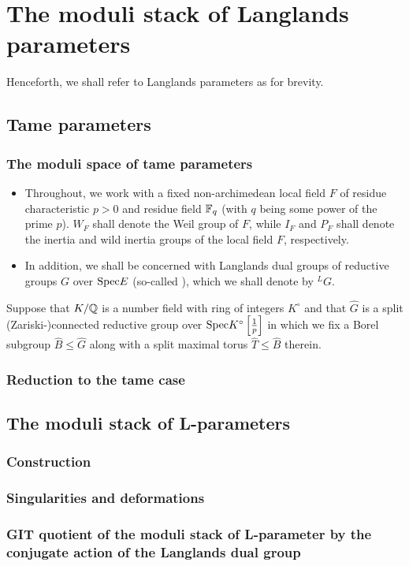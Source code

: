 \section{The moduli stack of Langlands parameters}
    \begin{convention}
        Henceforth, we shall refer to Langlands parameters as  for brevity.
    \end{convention}
    
    \subsection{Tame parameters}
        \subsubsection{The moduli space of tame parameters}
            \begin{convention}
                \item 
                \begin{itemize}
                    \item Throughout, we work with a fixed non-archimedean local field $F$ of residue characteristic $p > 0$ and residue field $\mathbb{F}_q$ (with $q$ being some power of the prime $p$). $W_F$ shall denote the Weil group of $F$, while $I_F$ and $P_F$ shall denote the inertia and wild inertia groups of the local field $F$, respectively.
                    \item In addition, we shall be concerned with Langlands dual groups of reductive groups $G$ over $\mathrm{Spec} E$ (so-called ), which we shall denote by ${}^LG$. 
                \end{itemize}
            \end{convention}
            \begin{convention}
                Suppose that $K/\mathbb{Q}$ is a number field with ring of integers $K^{\circ}$ and that $\hat{G}$ is a split (Zariski-)connected reductive group over $\mathrm{Spec} K^{\circ}\left[\frac1p\right]$ in which we fix a Borel subgroup $\hat{B} \leq \hat{G}$ along with a split maximal torus $\hat{T} \leq \hat{B}$ therein.
            \end{convention}
        
        \subsubsection{Reduction to the tame case}
        
    \subsection{The moduli stack of L-parameters}
        \subsubsection{Construction}
        
        \subsubsection{Singularities and deformations}
    
        \subsubsection{GIT quotient of the moduli stack of L-parameter by the conjugate action of the Langlands dual group}